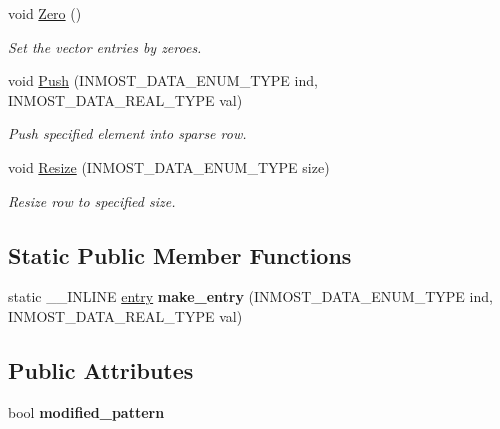 \begin{DoxyCompactItemize}
\item 
\hypertarget{classINMOST_1_1Solver_1_1Row_af7022d7b2c223927e07b22f43584c93b}{void \hyperlink{classINMOST_1_1Solver_1_1Row_af7022d7b2c223927e07b22f43584c93b}{Zero} ()}\label{classINMOST_1_1Solver_1_1Row_af7022d7b2c223927e07b22f43584c93b}

\begin{DoxyCompactList}\small\item\em Set the vector entries by zeroes. \end{DoxyCompactList}\item 
void \hyperlink{classINMOST_1_1Solver_1_1Row_af5a53ab2f8e8febc9ce3196ff054cb01}{Push} (I\-N\-M\-O\-S\-T\-\_\-\-D\-A\-T\-A\-\_\-\-E\-N\-U\-M\-\_\-\-T\-Y\-P\-E ind, I\-N\-M\-O\-S\-T\-\_\-\-D\-A\-T\-A\-\_\-\-R\-E\-A\-L\-\_\-\-T\-Y\-P\-E val)
\begin{DoxyCompactList}\small\item\em Push specified element into sparse row. \end{DoxyCompactList}\item 
void \hyperlink{classINMOST_1_1Solver_1_1Row_a5465388e8b93e0f2fe32fe62e29640ad}{Resize} (I\-N\-M\-O\-S\-T\-\_\-\-D\-A\-T\-A\-\_\-\-E\-N\-U\-M\-\_\-\-T\-Y\-P\-E size)
\begin{DoxyCompactList}\small\item\em Resize row to specified size. \end{DoxyCompactList}\end{DoxyCompactItemize}
\subsection*{Static Public Member Functions}
\begin{DoxyCompactItemize}
\item 
\hypertarget{classINMOST_1_1Solver_1_1Row_a709889bdf720d73e7aa874b5b6a0d231}{static \-\_\-\-\_\-\-I\-N\-L\-I\-N\-E \hyperlink{classINMOST_1_1Solver_1_1Row_a83f9b826189f21abd7ad395608901825}{entry} {\bfseries make\-\_\-entry} (I\-N\-M\-O\-S\-T\-\_\-\-D\-A\-T\-A\-\_\-\-E\-N\-U\-M\-\_\-\-T\-Y\-P\-E ind, I\-N\-M\-O\-S\-T\-\_\-\-D\-A\-T\-A\-\_\-\-R\-E\-A\-L\-\_\-\-T\-Y\-P\-E val)}\label{classINMOST_1_1Solver_1_1Row_a709889bdf720d73e7aa874b5b6a0d231}

\end{DoxyCompactItemize}
\subsection*{Public Attributes}
\begin{DoxyCompactItemize}
\item 
\hypertarget{classINMOST_1_1Solver_1_1Row_a417f7f35421de05227023d03a1c9c095}{bool {\bfseries modified\-\_\-pattern}}\label{classINMOST_1_1Solver_1_1Row_a417f7f35421de05227023d03a1c9c095}

\end{DoxyCompactItemize}


